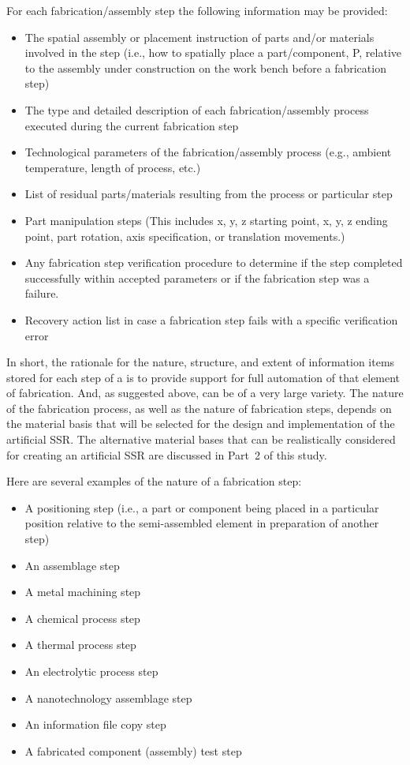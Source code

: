 For each fabrication/assembly step the following information may be
provided:

\begin{itemize}
\item The spatial assembly or placement instruction of parts and/or materials
involved in the step (i.e., how to spatially place a part/component, P,
relative to the assembly under construction on the work bench before a
fabrication step)
\item The type and detailed description of each fabrication/assembly
process executed during the current fabrication step
\item Technological parameters of the fabrication/assembly process (e.g.,
ambient temperature, length of process, etc.)
\item List of residual parts/materials resulting from the process or particular step
\item Part manipulation steps (This includes x, y, z starting point, x, y, z
ending point, part rotation, axis specification, or translation movements.)
\item Any fabrication step verification procedure to determine if the
step completed successfully within accepted parameters or if the
fabrication step was a failure.
\item Recovery action list in case a fabrication step fails with a
specific verification error
\end{itemize}

In short, the rationale for the nature, structure, and extent of
information items stored for each step of a  
is to provide support for full automation of that element of
fabrication. And, as suggested above,  can be
of a very large variety. The nature of the fabrication process, as well
as the nature of fabrication steps, depends on the material basis that will be
selected for the design and implementation of the artificial SSR. The
alternative material bases that can be realistically considered for
creating an artificial SSR are discussed in Part~2 of this study.

Here are several examples of the nature of a fabrication step:

\begin{itemize}
\item A positioning step (i.e., a part or component being placed in a particular position relative
to the semi-assembled element in preparation of another step)
\item An assemblage step
\item A metal machining step
\item A chemical process step
\item A thermal process step
\item An electrolytic process step
\item A nanotechnology assemblage step
\item An information file copy step
\item A fabricated component (assembly) test step
\end{itemize}

